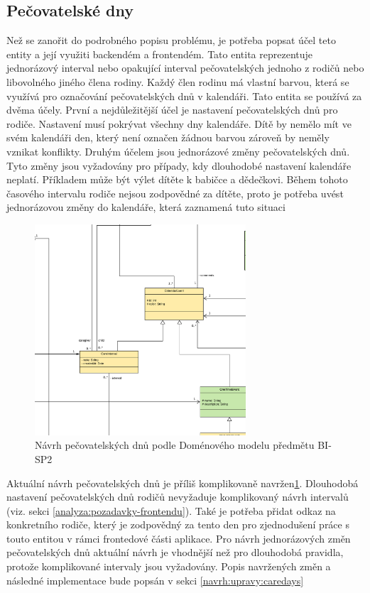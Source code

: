         \subsection{Pečovatelské dny}\label{analyza:pozadavky:caredays}
            Než se zanořit do podrobného popisu problému, je potřeba popsat účel teto entity a její využiti backendém a frontendém. Tato entita reprezentuje jednorázový interval nebo opakující interval pečovatelských jednoho z rodičů nebo libovolného jiného člena rodiny. Každý člen rodinu má vlastní barvou, která se využívá pro označování pečovatelských dnů v kalendáři. Tato entita se používá za dvěma účely. První a nejdůležitější účel je nastavení pečovatelských dnů pro rodiče. Nastavení musí pokrývat všechny dny kalendáře. Dítě by nemělo mít ve svém kalendáři den, který není označen žádnou barvou zároveň by neměly vznikat konflikty. Druhým účelem jsou jednorázové změny pečovatelských dnů. Tyto změny jsou vyžadovány pro případy, kdy dlouhodobé nastavení kalendáře neplatí. Příkladem může být výlet dítěte k babičce a dědečkovi. Během tohoto časového intervalu rodiče nejsou zodpovědné za dítěte, proto je potřeba uvést jednorázovou změny do kalendáře, která zaznamená tuto situaci 
            
            \begin{figure}\centering
	            \includegraphics[width=0.7\textwidth]{pdfs/CareDays1}
	            \caption[Návrh pečovatelských dnů]{Návrh pečovatelských dnů podle Doménového modelu předmětu BI-SP2}\label{image:caredays1}
            \end{figure}
            Aktuální návrh pečovatelských dnů je příliš komplikovaně navržen\ref{image:caredays1}. Dlouhodobá nastavení pečovatelských dnů rodičů nevyžaduje komplikovaný návrh intervalů (viz. sekci \ref{analyza:pozadavky-frontendu}). Také je potřeba přidat odkaz na konkretního rodiče, který je zodpovědný za tento den pro zjednodušení práce s touto entitou v rámci frontedové části aplikace. Pro návrh jednorázových změn pečovatelských dnů aktuální návrh je vhodnější než pro dlouhodobá pravidla, protože komplikované intervaly jsou vyžadovány. Popis navržených změn a následné implementace bude popsán v sekci \ref{navrh:upravy:caredays}
            
